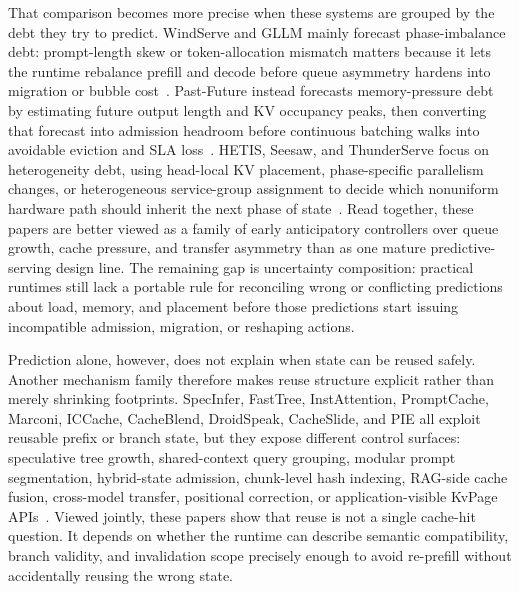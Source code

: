\documentclass[acmsmall,screen,review]{acmart}
\begin{document}
That comparison becomes more precise when these systems are grouped by the debt they try to predict. WindServe and GLLM mainly forecast phase-imbalance debt: prompt-length skew or token-allocation mismatch matters because it lets the runtime rebalance prefill and decode before queue asymmetry hardens into migration or bubble cost~\cite{windserve2025,guo2025gllm}. Past-Future instead forecasts memory-pressure debt by estimating future output length and KV occupancy peaks, then converting that forecast into admission headroom before continuous batching walks into avoidable eviction and SLA loss~\cite{gong2025pastfuture}. HETIS, Seesaw, and ThunderServe focus on heterogeneity debt, using head-local KV placement, phase-specific parallelism changes, or heterogeneous service-group assignment to decide which nonuniform hardware path should inherit the next phase of state~\cite{mo2025hetis,su2025seesaw,jiang2025thunderserve}. Read together, these papers are better viewed as a family of early anticipatory controllers over queue growth, cache pressure, and transfer asymmetry than as one mature predictive-serving design line. The remaining gap is uncertainty composition: practical runtimes still lack a portable rule for reconciling wrong or conflicting predictions about load, memory, and placement before those predictions start issuing incompatible admission, migration, or reshaping actions.

Prediction alone, however, does not explain when state can be reused safely. Another mechanism family therefore makes reuse structure explicit rather than merely shrinking footprints. SpecInfer, FastTree, InstAttention, PromptCache, Marconi, ICCache, CacheBlend, DroidSpeak, CacheSlide, and PIE all exploit reusable prefix or branch state, but they expose different control surfaces: speculative tree growth, shared-context query grouping, modular prompt segmentation, hybrid-state admission, chunk-level hash indexing, RAG-side cache fusion, cross-model transfer, positional correction, or application-visible KvPage APIs~\cite{miao2024specinfer,pan2025fasttree,pan2025instattention,gim2024promptcache,pan2025marconi,yu2025iccache,yao2025cacheblend,liu2026droidspeak,cacheslide2025,gim2025pie}. Viewed jointly, these papers show that reuse is not a single cache-hit question. It depends on whether the runtime can describe semantic compatibility, branch validity, and invalidation scope precisely enough to avoid re-prefill without accidentally reusing the wrong state.
\end{document}
